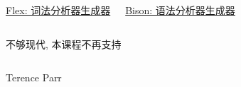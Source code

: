 \begin{frame}{}
  \begin{columns}
      \begin{center}
        \href{https://en.wikipedia.org/wiki/Flex_(lexical_analyser_generator)}{Flex: 词法分析器生成器}
      \end{center}
      \begin{center}
        \href{https://en.wikipedia.org/wiki/GNU_Bison}{Bison: 语法分析器生成器}
      \end{center}
  \end{columns}

  \pause
  \vspace{0.50cm}
  \begin{center}
    不够现代, 本课程不再支持
  \end{center}
\end{frame}

\begin{frame}{}
  \begin{columns}
      \begin{center}
        Terence Parr
      \end{center}
  \end{columns}

  \vspace{0.80cm}
  \begin{center}
  \end{center}
\end{frame}

\begin{frame}{}
  \begin{columns}
  \end{columns}
\end{frame}

\begin{frame}{}
  \begin{columns}
  \end{columns}
\end{frame}
